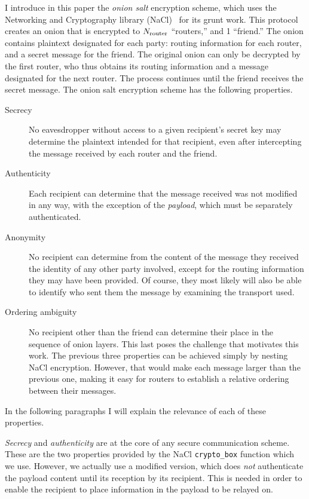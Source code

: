 \documentclass[letterpaper,twocolumn,amsmath,amssymb,pre,aps,10pt]{revtex4-1}
\begin{document}
I introduce in this paper the \emph{onion salt} encryption scheme,
which uses the Networking and Cryptography library
(NaCl)~\cite{bernstein2009cryptography} for its grunt work.  This
protocol creates an onion that is encrypted to $N_{\text{router}}$ ``routers,''
and 1 ``friend.''  The onion contains plaintext designated for each
party: routing information for each router, and a secret message for
the friend.  The original onion can only be decrypted by the first
router, who thus obtains its routing information and a message
designated for the next router.  The process continues until the
friend receives the secret message.  The onion salt encryption scheme
has the following properties.
\begin{description}
\item[Secrecy] No eavesdropper without access to a given recipient's
  secret key may determine the plaintext intended for that recipient,
  even after intercepting the message received by each router and the
  friend.
\item[Authenticity] Each recipient can determine that the message
  received was not modified in any way, with the exception of the
  \emph{payload}, which must be separately authenticated.
\item[Anonymity] No recipient can determine from the content of the
  message they received the identity of any other party involved,
  except for the routing information they may have been provided.  Of
  course, they most likely will also be able to identify who sent them
  the message by examining the transport used.
\item[Ordering ambiguity] No recipient other than the friend can determine
  their place in the sequence of onion layers.  This last poses the
  challenge that motivates this work.  The previous three properties
  can be achieved simply by nesting NaCl encryption.  However, that
  would make each message larger than the previous one, making it easy
  for routers to establish a relative ordering between their messages.
\end{description}
In the following paragraphs I will explain the relevance of each of
these properties.

\emph{Secrecy} and \emph{authenticity} are at the core of any secure
communication scheme.  These are the two properties provided by the
NaCl \verb!crypto_box! function which we use.  However, we actually
use a modified version, which does \emph{not} authenticate the payload
content until its reception by its recipient.  This is needed in order
to enable the recipient to place information in the payload to be
relayed on.
\end{document}
